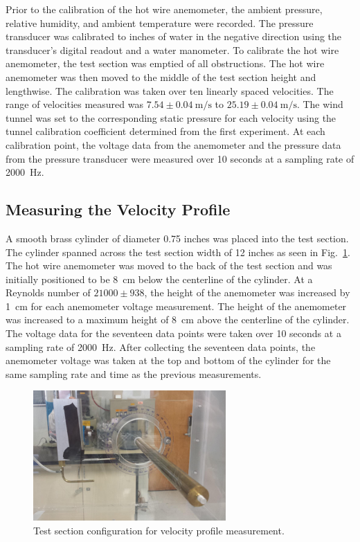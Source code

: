 \documentclass[journal,letterpaper]{IEEEtran}
\begin{document}
Prior to the calibration of the hot wire anemometer, the ambient pressure, relative humidity, and ambient temperature were recorded.
The pressure transducer was calibrated to inches of water in the negative direction using the transducer's digital readout and a water manometer.
To calibrate the hot wire anemometer, the test section was emptied of all obstructions.
The hot wire anemometer was then moved to the middle of the test section height and lengthwise.
The calibration was taken over ten linearly spaced velocities.
The range of velocities measured was $7.54 \pm \qty{0.04}{\m\per\s}$ to $25.19 \pm \qty{0.04}{\m\per\s}$.
The wind tunnel was set to the corresponding static pressure for each velocity using the tunnel calibration coefficient determined from the first experiment.
At each calibration point, the voltage data from the anemometer and the pressure data from the pressure transducer were measured over 10 seconds at a sampling rate of \qty{2000}{\hertz}.

\subsection{Measuring the Velocity Profile}

A smooth brass cylinder of diameter 0.75 inches was placed into the test section.
The cylinder spanned across the test section width of 12 inches as seen in Fig.~\ref{fig:cylinder}.
The hot wire anemometer was moved to the back of the test section and was initially positioned to be \qty{8}{\cm} below the centerline of the cylinder.
At a Reynolds number of $21000 \pm 938$, the height of the anemometer was increased by \qty{1}{\cm} for each anemometer voltage measurement.
The height of the anemometer was increased to a maximum height of \qty{8}{\cm} above the centerline of the cylinder.
The voltage data for the seventeen data points were taken over 10 seconds at a sampling rate of \qty{2000}{\hertz}.
After collecting the seventeen data points, the anemometer voltage was taken at the top and bottom of the cylinder for the same sampling rate and time as the previous measurements.

\begin{figure}[H]
    \centering
    \includegraphics[width=2.9in]{Cylinder}
    \caption{Test section configuration for velocity profile measurement.}
    \label{fig:cylinder}
\end{figure}
\end{document}
